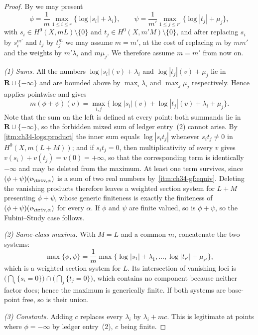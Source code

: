 \begin{proof}
By  we may present
\[
 \phi=\frac1m\max_{1\le i\le r}\{\log|s_i|+\lambda_i\},
 \qquad
 \psi=\frac1{m'}\max_{1\le j\le r'}\{\log|t_j|+\mu_j\},
\]
with $s_i\in H^0(X,mL)\setminus\{0\}$ and
$t_j\in H^0(X,m'M)\setminus\{0\}$, and after replacing $s_i$ by
$s_i^{m'}$ and $t_j$ by $t_j^{m}$ we may assume $m=m'$, at the cost
of replacing $m$ by $mm'$ and the weights by $m'\lambda_i$ and
$m\mu_j$.  We therefore assume $m=m'$ from now on.

\emph{(1) Sums.}  All the numbers $\log|s_i|(v)+\lambda_i$ and
$\log|t_j|(v)+\mu_j$ lie in $\mathbf R\cup\{-\infty\}$ and are bounded
above by $\max_i\lambda_i$ and $\max_j\mu_j$ respectively.  Hence
 applies pointwise and gives
\[
 m(\phi+\psi)(v)
 =\max_{i,j}\bigl\{\log|s_i|(v)+\log|t_j|(v)+\lambda_i+\mu_j\bigr\}.
\]
Note that the sum on the left is defined at every point: both summands lie
in $\mathbf R\cup\{-\infty\}$, so the forbidden mixed sum of ledger
entry~(2) cannot arise.  By
\,\cref{itm:ch34-logs:product} the inner sum
equals $\log|s_it_j|$ whenever $s_it_j\ne0$ in
$H^0(X,m(L+M))$; and
if $s_it_j=0$, then multiplicativity of every $v$ gives
$v(s_i)+v(t_j)=v(0)=+\infty$, so that the corresponding term is
identically $-\infty$ and may be deleted from the maximum.  At least one
term survives, since $(\phi+\psi)(v_{\triv,\alpha})$ is a sum of two real
numbers by
\,\cref{itm:ch34-gf:equiv}.  Deleting the
vanishing products therefore leaves a weighted section system for
$L+M$ presenting $\phi+\psi$, whose generic finiteness is exactly the
finiteness of $(\phi+\psi)(v_{\triv,\alpha})$ for every $\alpha$.  If
$\phi$ and $\psi$ are finite valued, so is $\phi+\psi$, so the
Fubini--Study case follows.

\emph{(2) Same-class maxima.}  With $M=L$ and a common $m$, concatenate
the two systems:
\[
 \max\{\phi,\psi\}=\frac1m
 \max\bigl\{\log|s_1|+\lambda_1,\ldots,
            \log|t_{r'}|+\mu_{r'}\bigr\},
\]
which is a weighted section system for $L$.  Its intersection of vanishing
loci is $\bigl(\bigcap_i\{s_i=0\}\bigr)\cap\bigl(\bigcap_j\{t_j=0\}\bigr)$,
which contains no component because neither factor does; hence the maximum
is generically finite.  If both systems are base-point free, so is their
union.

\emph{(3) Constants.}  Adding $c$ replaces every $\lambda_i$ by
$\lambda_i+mc$.  This is legitimate at points where $\phi=-\infty$ by
ledger entry~(2), $c$ being finite.


\end{proof}
